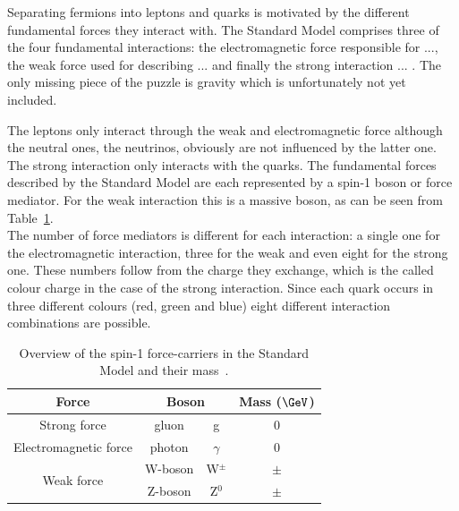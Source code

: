 Separating fermions into leptons and quarks is motivated by the different fundamental forces they interact with.
The Standard Model comprises three of the four fundamental interactions: the electromagnetic force responsible for ..., the weak force used for describing ... and finally the strong interaction ... .
The only missing piece of the puzzle is gravity which is unfortunately not yet included.

The leptons only interact through the weak and electromagnetic force although the neutral ones, the neutrinos, obviously are not influenced by the latter one. The strong interaction only interacts with the quarks.
The fundamental forces described by the Standard Model are each represented by a spin-1 boson or force mediator.
For the weak interaction this is a massive boson, as can be seen from Table~\ref{table::ForceCarriers}.
\\
The number of force mediators is different for each interaction: a single one for the electromagnetic interaction, three for the weak and even eight for the strong one. These numbers follow from the charge they exchange, which is the called colour charge in the case of the strong interaction. Since each quark occurs in three different colours (red, green and blue) eight different interaction combinations are possible.

\begin{table}[h!t]
 \centering
 \caption{Overview of the spin-1 force-carriers in the Standard Model and their mass~\cite{WMass,ZMass}.} \label{table::ForceCarriers}
 \begin{tabular}{|c|cc|c|}%
  \hline
  \textbf{Force} 		&\multicolumn{2}{c|}{\textbf{Boson}} 	& \textbf{Mass ($\GeV$)}	\\%
  \hline
  Strong force 			& gluon 	& g 			& 0 				\\%
  \hline
  Electromagnetic force		& photon 	& $\gamma$ 		& 0 				\\%
  \hline
  \multirow{2}{*}{Weak force} 	& W-boson 	& W$^{\pm}$ 		& $\pm$ 			\\%
				& Z-boson 	& Z$^{0}$ 		& $\pm$ 			\\%
  \hline
 \end{tabular}
\end{table}

